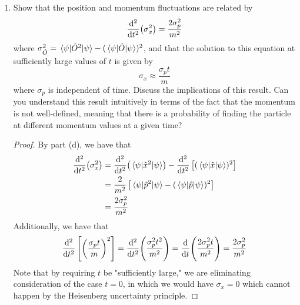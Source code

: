 \documentclass[../psets.tex]{subfiles}
\begin{document}
\begin{enumerate}
\begin{enumerate}
\begin{proof}
\begin{align*}
                &= 2\dv{t}(\ev{\hat{x}}{\psi})\cdot\dv{t}(\ev{\hat{x}}{\psi})+2\ev{\hat{x}}{\psi}\cdot\dv[2]{t}(\ev{\hat{x}}{\psi})\\
                &= \frac{2p_0^2}{m^2}+2x_0\cdot\underbrace{\dv{t}(\frac{p_0}{m})}_0\\
                \Aboxed{\dv[2]{t}\left[ (\ev{\hat{x}}{\psi})^2 \right] &= \frac{2}{m^2}(\ev{\hat{p}}{\psi})^2}
            \end{align*}
        \end{proof}
        \item Show that the position and momentum fluctuations are related by
        \begin{equation}
            \dv[2]{t}(\sigma_x^2) = \frac{2\sigma_p^2}{m^2}
        \end{equation}
        where $\sigma_{\hat{O}}^2=\ev{\hat{O}^2}{\psi}-(\ev{\hat{O}}{\psi})^2$, and that the solution to this equation at sufficiently large values of $t$ is given by
        \begin{equation}\label{eqn:4.6}
            \sigma_x \approx \frac{\sigma_pt}{m}
        \end{equation}
        where $\sigma_p$ is independent of time. Discuss the implications of this result. Can you understand this result intuitively in terms of the fact that the momentum is not well-defined, meaning that there is a probability of finding the particle at different momentum values at a given time?
        \begin{proof}
            By part (d), we have that
            \begin{align*}
                \dv[2]{t}(\sigma_x^2) &= \dv[2]{t}(\ev{\hat{x}^2}{\psi})-\dv[2]{t}\left[ (\ev{\hat{x}}{\psi})^2 \right]\\
                &= \frac{2}{m^2}\left[ \ev{\hat{p}^2}{\psi}-(\ev{\hat{p}}{\psi})^2 \right]\\
                &= \frac{2\sigma_p^2}{m^2}
            \end{align*}
            Additionally, we have that
            \begin{equation*}
                \dv[2]{t}\left[ \left( \frac{\sigma_pt}{m} \right)^2 \right] = \dv[2]{t}(\frac{\sigma_p^2t^2}{m^2})
                = \dv{t}(\frac{2\sigma_p^2t}{m^2})
                = \frac{2\sigma_p^2}{m^2}
            \end{equation*}
            Note that by requiring $t$ be "sufficiently large," we are eliminating consideration of the case $t=0$, in which we would have $\sigma_x=0$ which cannot happen by the Heisenberg uncertainty principle.\par

\end{proof}
\end{enumerate}
\end{enumerate}
\end{document}
